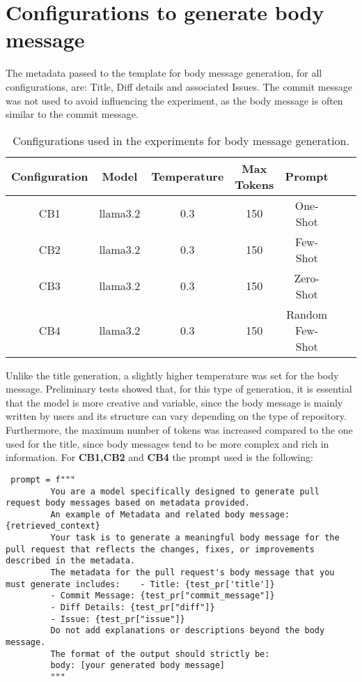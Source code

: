 \section{Configurations to generate body message}
The metadata passed to the
template for body message generation, for all configurations, are: Title, Diff details and  associated Issues.
The commit message was not used to avoid influencing the experiment, as the body message is often similar to the commit message.
\begin{table}[H]
\centering
\begin{tabular}{|c|c|c|c|c|c|c|}
\hline
\textbf{Configuration} & \textbf{Model} & \textbf{Temperature} & \textbf{Max Tokens} & \textbf{Prompt}  \\ \hline
CB1 & llama3.2 & 0.3 & 150 & One-Shot \\ \hline
CB2 & llama3.2 & 0.3 & 150 & Few-Shot \\ \hline
CB3 & llama3.2 & 0.3 & 150 & Zero-Shot \\ \hline
CB4 & llama3.2 & 0.3 & 150 & Random Few-Shot \\ \hline
\end{tabular}
\caption{Configurations used in the experiments for body message generation.}
\end{table}
Unlike the title generation, a slightly higher temperature was set for the body message. Preliminary tests showed that, for this type of generation, it is essential that the model is more creative and variable, since the body message is mainly written by users and its structure can vary depending on the type of repository. Furthermore, the maximum number of tokens was increased compared to the one used for the title, since body messages tend to be more complex and rich in information. For \textbf{CB1,CB2} and \textbf{CB4} the prompt used is the following:
\begin{verbatim}
 prompt = f""" 
         You are a model specifically designed to generate pull request body messages based on metadata provided.     
         An example of Metadata and related body message:    {retrieved_context}  
         Your task is to generate a meaningful body message for the pull request that reflects the changes, fixes, or improvements described in the metadata.     
         The metadata for the pull request's body message that you must generate includes:    - Title: {test_pr['title']}   
         - Commit Message: {test_pr["commit_message"]}   
         - Diff Details: {test_pr["diff"]}    
         - Issue: {test_pr["issue"]}    
         Do not add explanations or descriptions beyond the body message.    
         The format of the output should strictly be: 
         body: [your generated body message]  
         """
\end{verbatim}
